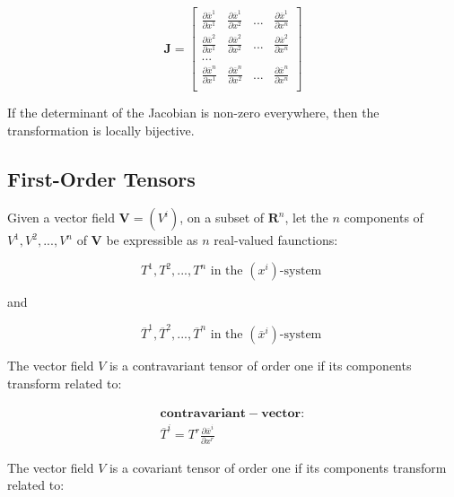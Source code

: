 \documentclass{article}
\begin{document}
\begin{equation}
	\mathbf{ J } =
	\begin{bmatrix}
	\frac{ \partial \overline{ x }^1 }{ \partial x^1 } & \frac{ \partial \overline{ x }^1 }{ \partial x^2 } & ... & \frac{ \partial \overline{ x }^1 }{ \partial x^n }  \\
	\frac{ \partial \overline{ x }^2 }{ \partial x^1 } & \frac{ \partial \overline{ x }^2 }{ \partial x^2 } & ... & \frac{ \partial \overline{ x }^2 }{ \partial x^n }  \\
	...\\
	\frac{ \partial \overline{ x }^n }{ \partial x^1 } & \frac{ \partial \overline{ x }^n }{ \partial x^2 } & ... & \frac{ \partial \overline{ x }^n }{ \partial x^n }  \\
	\end{bmatrix}
\end{equation}

If the determinant of the Jacobian is non-zero everywhere, then the transformation is locally bijective.


\subsection{First-Order Tensors}

Given a vector field $\mathbf{ V } = ( V^i )$, on a subset of $\mathbf{ R }^n$, let the $n$ components of $V^1, V^2, ..., V^n$ of $\mathbf{ V }$ be expressible as $n$ real-valued faunctions:

\begin{equation*}
	T^1, T^2, ..., T^n \text{ in the $(x^i)$-system }
\end{equation*}

and

\begin{equation*}
	\overline{ T }^1, \overline{ T }^2, ..., \overline{ T }^n \text{ in the $(\overline{ x }^i)$-system }
\end{equation*}

The vector field $V$ is a contravariant tensor of order one if its components transform related to:

\begin{align}
	\mathbf{ contravariant-vector: }\\
	\overline{ T }^i = T^r \frac{ \partial \overline{ x }^i }{ \partial x^r }
\end{align}

The vector field $V$ is a covariant tensor of order one if its components transform related to:
\end{document}
